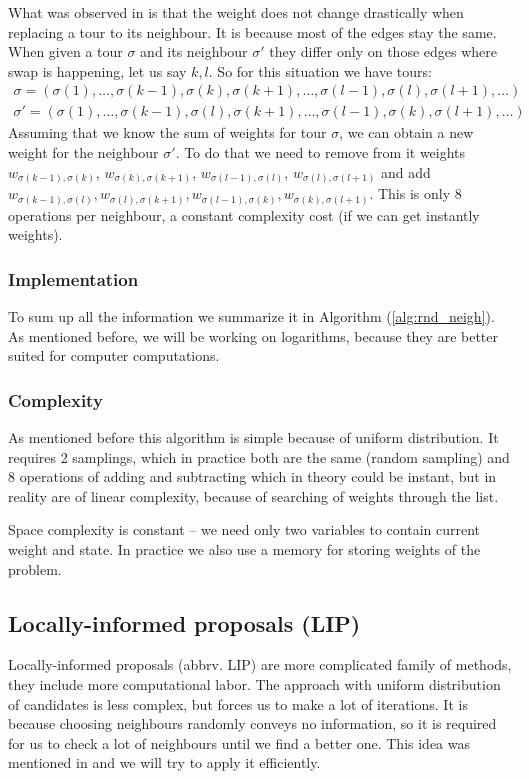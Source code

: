 		What was observed in \cite{decryption_tsp_MCMC} is that the weight does not change drastically when replacing a tour to its neighbour. It is because most of the edges stay the same. When given a tour $\sigma$ and its neighbour $\sigma'$ they differ only on those edges where swap is happening, let us say $k,l$. So for this situation we have tours:
		\begin{align*}
			\sigma = (\sigma(1), \ldots, \sigma(k-1), \sigma(k), \sigma(k+1), \ldots, \sigma(l-1), \sigma(l), \sigma(l+1), \ldots) \\
			\sigma' = (\sigma(1), \ldots, \sigma(k-1), \sigma(l), \sigma(k+1), \ldots, \sigma(l-1), \sigma(k), \sigma(l+1), \ldots)
		\end{align*}
		Assuming that we know the sum of weights for tour $\sigma$, we can obtain a new weight for the neighbour $\sigma'$. To do that we need to remove from it weights $w_{\sigma(k-1), \sigma(k)}$, $w_{\sigma(k), \sigma(k+1)}$, $w_{\sigma(l-1), \sigma(l)}$, $w_{\sigma(l), \sigma(l+1)}$ and add $w_{\sigma(k-1), \sigma(l)}, w_{\sigma(l), \sigma(k+1)}, w_{\sigma(l-1), \sigma(k)}, w_{\sigma(k), \sigma(l+1)}$. This is only $8$ operations per neighbour, a constant complexity cost (if we can get instantly weights).
		
	\subsubsection{Implementation}
		To sum up all the information we summarize it in Algorithm (\ref{alg:rnd_neigh}). As mentioned before, we will be working on logarithms, because they are better suited for computer computations.
		
		
		
	\subsubsection{Complexity}
		As mentioned before this algorithm is simple because of uniform distribution. It requires 2 samplings, which in practice both are the same (random sampling) and 8 operations of adding and subtracting which in theory could be instant, but in reality are of linear complexity, because of searching of weights through the list.
		
		Space complexity is constant -- we need only two variables to contain current weight and state. In practice we also use a memory for storing weights of the problem.
		\clearpage
		
\subsection{Locally-informed proposals (LIP)}
	Locally-informed proposals (abbrv. LIP) are more complicated family of methods, they include more computational labor. The approach with uniform distribution of candidates is less complex, but forces us to make a lot of iterations. It is because choosing neighbours randomly conveys no information, so it is required for us to check a lot of neighbours until we find a better one. This idea was mentioned in \cite{maddison2021oops} and we will try to apply it efficiently.
	
